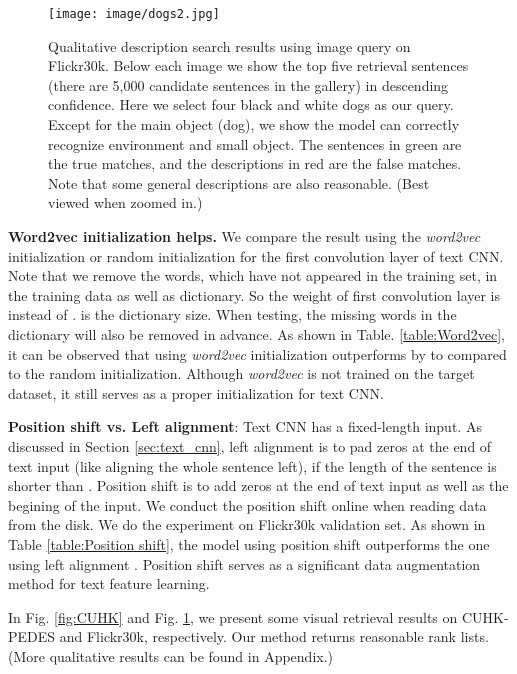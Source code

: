 \documentclass[10pt,final,journal]{IEEEtran}
\begin{document}
\begin{figure}[t]
\begin{center}
\texttt{[image: image/dogs2.jpg]}
\end{center}
   \caption{Qualitative description search results using image query on Flickr30k. Below each image we show the top five retrieval sentences (there are 5,000 candidate sentences in the gallery) in descending confidence. Here we select four black and white dogs as our query. Except for the main object (dog), we show the model can correctly recognize environment and small object. The sentences in green are the true matches, and the descriptions in red are the false matches. Note that some general descriptions are also reasonable. (Best viewed when zoomed in.)}
\label{fig:dogs}
\end{figure}

\textbf{Word2vec initialization helps.} 
We compare the result using the \emph{word2vec} initialization or random initialization \cite{glorot2010understanding} for the first convolution layer of text CNN. Note that we remove the words, which have not appeared in the training set, in the training data as well as dictionary. So the weight of first convolution layer is  instead of .  is the dictionary size. When testing, the missing words in the dictionary will also be removed in advance. As shown in Table. \ref{table:Word2vec}, it can be observed that using \emph{word2vec} initialization outperforms by  to  compared to the random initialization. Although \emph{word2vec} is not trained on the target dataset, it still serves as a proper initialization for text CNN.

\textbf{Position shift vs. Left alignment}: 
Text CNN has a fixed-length input. As discussed in Section \ref{sec:text_cnn}, left alignment is to pad zeros at the end of text input (like aligning the whole sentence left), if the length of the sentence is shorter than . Position shift is to add zeros at the end of text input as well as the begining of the input. We conduct the position shift online when reading data from the disk. We do the experiment on Flickr30k validation set. As shown in Table \ref{table:Position shift}, the model using position shift outperforms the one using left alignment . Position shift serves as a significant data augmentation method for text feature learning. 

In Fig. \ref{fig:CUHK} and Fig. \ref{fig:dogs}, we present some visual retrieval results on CUHK-PEDES  and  Flickr30k, respectively. Our method returns reasonable rank lists. (More qualitative results can be found in Appendix.)
\end{document}
